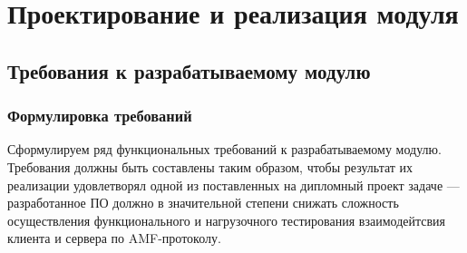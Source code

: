 \chapter{Проектирование и реализация модуля}

\section{Требования к разрабатываемому модулю}

\subsection{Формулировка требований}
Сформулируем ряд функциональных требований к разрабатываемому модулю. Требования должны быть составлены
таким образом, чтобы результат их реализации удовлетворял одной из поставленных на дипломный проект задаче ---
разработанное ПО должно в значительной степени снижать сложность осуществления функционального
и нагрузочного тестирования взаимодейтсвия клиента и сервера по AMF-протоколу.

